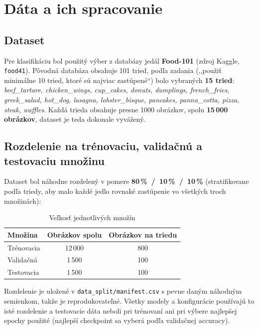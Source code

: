 \section{Dáta a ich spracovanie}
\label{sec:data}

\subsection{Dataset}

Pre klasifikáciu bol použitý výber z databázy jedál \textbf{Food-101}
(zdroj Kaggle, \texttt{food41}). Pôvodná databáza obsahuje 101 tried, podľa
zadania (,,použiť minimálne 10 tried, ktoré sú najviac zastúpené``) bolo
vybraných \textbf{15 tried}: \emph{beef\_tartare, chicken\_wings, cup\_cakes,
donuts, dumplings, french\_fries, greek\_salad, hot\_dog, lasagna,
lobster\_bisque, pancakes, panna\_cotta, pizza, steak, waffles}. Každá trieda
obsahuje presne 1000 obrázkov, spolu \textbf{15\,000 obrázkov}, dataset je
teda dokonale vyvážený.

\subsection{Rozdelenie na trénovaciu, validačnú a testovaciu množinu}

Dataset bol náhodne rozdelený v pomere \textbf{80\,\%~/~10\,\%~/~10\,\%}
(stratifikovane podľa triedy, aby malo každé jedlo rovnaké zastúpenie vo
všetkých troch množinách):

\begin{table}[H]
    \centering
    \caption{Veľkosť jednotlivých množín}
    \label{tab:data}
    \begin{tabular}{lcc}
        \toprule
        Množina & Obrázkov spolu & Obrázkov na triedu \\
        \midrule
        Trénovacia  & 12\,000 & 800 \\
        Validačná   & 1\,500  & 100 \\
        Testovacia  & 1\,500  & 100 \\
        \bottomrule
    \end{tabular}
\end{table}

Rozdelenie je uložené v \texttt{data\_split/manifest.csv} s pevne daným
náhodným semienkom, takže je reprodukovateľné. Všetky modely a konfigurácie
používajú to isté rozdelenie a testovacie dáta neboli pri trénovaní ani pri
výbere najlepšej epochy použité (najlepší checkpoint sa vyberá podľa
validačnej accuracy).

